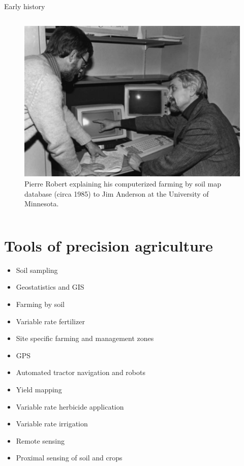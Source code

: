 \documentclass[11pt,dvipsnames,ignorenonframetext,aspectratio=169]{beamer}
\providecommand{\tightlist}{%
  \setlength{\itemsep}{0pt}\setlength{\parskip}{0pt}}
\begin{document}
\begin{frame}{Early history}
\begin{columns}[T, onlytextwidth]
\begin{figure}
\includegraphics[width=0.98\linewidth]{../images/pierre-robert-in-development} \caption{Pierre Robert explaining his computerized farming by soil map database (circa 1985) to Jim Anderson at the University of Minnesota.}\label{fig:pierre-robers-computerized-farming}
\end{figure}

\end{columns}
\end{frame}

\hypertarget{tools-of-precision-agriculture}{%
\section{Tools of precision
agriculture}\label{tools-of-precision-agriculture}}

\begin{frame}{}
\protect\hypertarget{section-3}{}
\begin{itemize}
\tightlist
\item
  Soil sampling
\item
  Geostatistics and GIS
\item
  Farming by soil
\item
  Variable rate fertilizer
\item
  Site specific farming and management zones
\item
  GPS
\item
  Automated tractor navigation and robots
\item
  Yield mapping
\item
  Variable rate herbicide application
\item
  Variable rate irrigation
\item
  Remote sensing
\item
  Proximal sensing of soil and crops
\end{itemize}
\end{frame}
\end{document}

